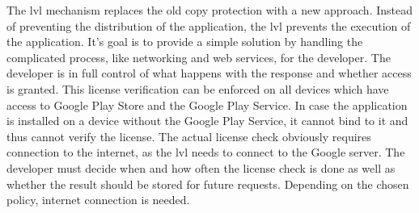 \newline
The \gls{lvl} mechanism replaces the old copy protection with a new approach.
Instead of preventing the distribution of the application, the \gls{lvl} prevents the execution of the application.
\newline
It's goal is to provide a simple solution by handling the complicated process, like networking and web services, for the developer.
The developer is in full control of what happens with the response and whether access is granted.
This license verification can be enforced on all devices which have access to Google Play Store and the Google Play Service.
In case the application is installed on a device without the Google Play Service, it cannot bind to it and thus cannot verify the license.
The actual license check obviously requires connection to the internet, as the \gls{lvl} needs to connect to the Google server.
The developer must decide when and how often the license check is done as well as whether the result should be stored for future requests.
Depending on the chosen policy, internet connection is needed. \cite{developersLicensingOverview} \cite{developersLicensingSetup} \cite{developersLicensingAdding} \cite{digipomLvl}
